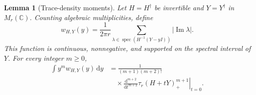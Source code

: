\documentclass[aps,prl,reprint,superscriptaddress,longbibliography,floatfix,raggedbottom]{revtex4-2}
\newtheorem{lemma}{Lemma}
\newcommand{\C}{\mathbb C}
\newcommand{\dd}{\,\mathrm d}
\newcommand{\abs}[1]{\lvert #1\rvert}
\DeclareMathOperator{\spec}{spec}
\newcommand{\tr}{\tau}
\begin{document}
\begin{lemma}[Trace-density moments]\label{lem:density}
Let $H=H^\dagger$ be invertible and $Y=Y^\dagger$ in $M_r(\C)$.
Counting algebraic multiplicities, define
\[
w_{H,Y}(y)=\frac1{2\pi r}
\sum_{\lambda\in\spec(H^{-1}(Y-yI))}\abs{\operatorname{Im}\lambda}.
\]
This function is continuous, nonnegative, and supported on the spectral
interval of $Y$. For every integer $m\ge0$,
\begin{equation}\label{eq:densitymoments}
\begin{split}
\int y^m w_{H,Y}(y)\dd y
&=\frac1{(m+1)(m+2)!}\\
&\quad\times\left.\frac{\mathrm d^{m+2}}{\mathrm dt^{m+2}}
\tr_r(H+tY)_+^{m+1}\right|_{t=0}.
\end{split}
\end{equation}
\end{lemma}
\end{document}
